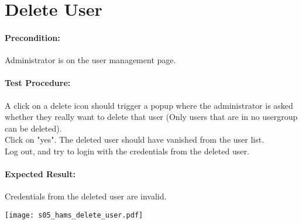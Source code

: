 \documentclass{scrreprt}
\begin{document}
\begin{minipage}[c]{0.4\textwidth}
\section{Delete User}

\paragraph{Precondition:}
Administrator is on the user management page.\\

\paragraph{Test Procedure:}
A click on a delete icon should trigger a popup where the administrator is asked whether they really want to delete that user (Only users that are in no usergroup can be deleted).\\
Click on "yes". The deleted user should have vanished from the user list.\\
Log out, and try to login with the credentials from the deleted user.\\

\paragraph{Expected Result:}
Credentials from the deleted user are invalid.

\end{minipage}
\hfill
\begin{minipage}[c]{0.5\textwidth}
	\texttt{[image: s05\_hams\_delete\_user.pdf]}
\end{minipage}
\end{document}
